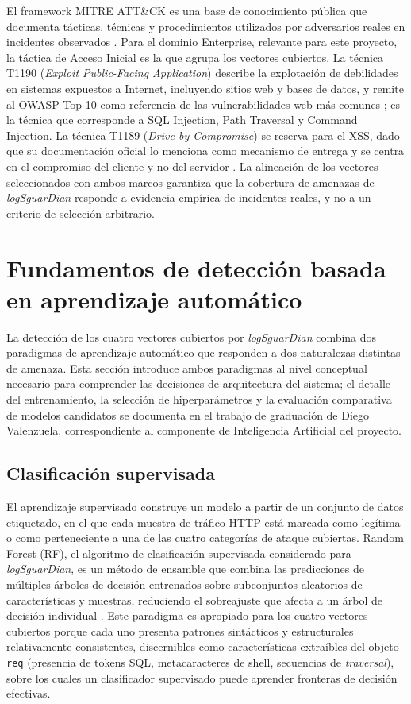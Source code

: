 El framework MITRE ATT\&CK es una base de conocimiento pública que documenta tácticas,
técnicas y procedimientos utilizados por adversarios reales en incidentes observados
\cite{mitreattack}. Para el dominio Enterprise, relevante para este proyecto, la táctica de Acceso
Inicial es la que agrupa los vectores cubiertos. La técnica T1190 (\textit{Exploit Public-Facing
Application}) describe la explotación de debilidades en sistemas expuestos a Internet, incluyendo
sitios web y bases de datos, y remite al OWASP Top 10 como referencia de las vulnerabilidades web
más comunes \cite{mitret1190}; es la técnica que corresponde a SQL Injection, Path Traversal y
Command Injection. La técnica T1189 (\textit{Drive-by Compromise}) se reserva para el XSS, dado
que su documentación oficial lo menciona como mecanismo de entrega y se centra en el compromiso
del cliente y no del servidor \cite{mitret1189}. La alineación de los vectores seleccionados con
ambos marcos garantiza que la cobertura de amenazas de \textit{logSguarDian} responde a evidencia
empírica de incidentes reales, y no a un criterio de selección arbitrario.

\section{Fundamentos de detección basada en aprendizaje automático}
\label{sec:ml-conceptos}
La detección de los cuatro vectores cubiertos por \textit{logSguarDian} combina dos paradigmas de
aprendizaje automático que responden a dos naturalezas distintas de amenaza. Esta sección
introduce ambos paradigmas al nivel conceptual necesario para comprender las decisiones de
arquitectura del sistema; el detalle del entrenamiento, la selección de hiperparámetros y la
evaluación comparativa de modelos candidatos se documenta en el trabajo de graduación de Diego
Valenzuela, correspondiente al componente de Inteligencia Artificial del proyecto.

\subsection{Clasificación supervisada}
El aprendizaje supervisado construye un modelo a partir de un conjunto de datos etiquetado, en el
que cada muestra de tráfico HTTP está marcada como legítima o como perteneciente a una de las
cuatro categorías de ataque cubiertas. Random Forest (RF), el algoritmo de clasificación supervisada considerado para \textit{logSguarDian}, es un método de ensamble que combina las predicciones de
múltiples árboles de decisión entrenados sobre subconjuntos aleatorios de características y
muestras, reduciendo el sobreajuste que afecta a un árbol de decisión individual
\cite{breiman2001random}. Este paradigma es apropiado para los cuatro vectores cubiertos porque cada uno
presenta patrones sintácticos y estructurales relativamente consistentes, discernibles como
características extraíbles del objeto \texttt{req} (presencia de tokens SQL, metacaracteres de
shell, secuencias de \textit{traversal}), sobre los cuales un clasificador supervisado puede
aprender fronteras de decisión efectivas.

